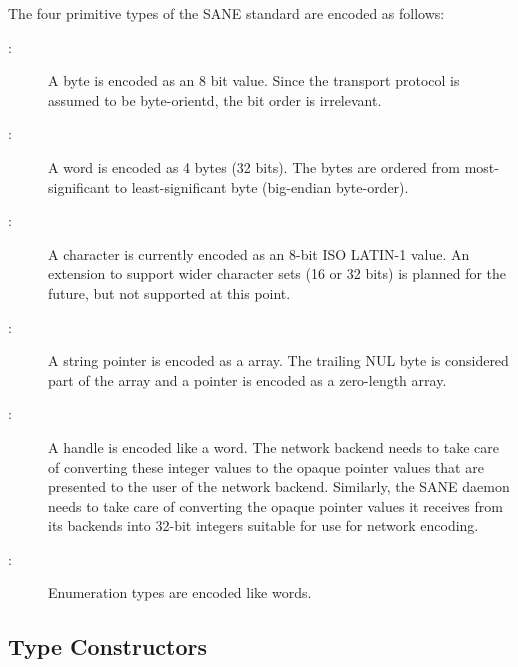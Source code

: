 The four primitive types of the SANE standard are encoded as follows:
\begin{description}

\item[:] A byte is encoded as an 8 bit value.
  Since the transport protocol is assumed to be byte-orientd, the bit
  order is irrelevant.

\item[:] A word is encoded as 4 bytes (32
  bits).  The bytes are ordered from most-significant to
  least-significant byte (big-endian byte-order).

\item[:] A character is currently encoded as an 8-bit
  ISO LATIN-1 value.  An extension to support wider character sets (16 or 32
  bits) is planned for the future, but not supported at this point.

\item[:] A string pointer is encoded as a
   array.  The trailing NUL byte is considered part
  of the array and a  pointer is encoded as a zero-length
  array.

\item[:] A handle is encoded like a word.
  The network backend needs to take care of converting these integer
  values to the opaque pointer values that are presented to the user
  of the network backend.  Similarly, the SANE daemon needs to take
  care of converting the opaque pointer values it receives from its
  backends into 32-bit integers suitable for use for network encoding.

\item[{\em{}}:] Enumeration types are encoded
  like words.

\end{description}

\subsection{Type Constructors}


